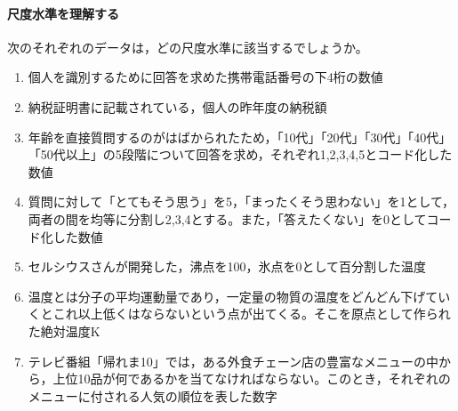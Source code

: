 \documentclass{ltjsbook}
\begin{document}
\paragraph{尺度水準を理解する}次のそれぞれのデータは，どの尺度水準に該当するでしょうか。
\begin{enumerate}
	\item 個人を識別するために回答を求めた携帯電話番号の下4桁の数値
	\item 納税証明書に記載されている，個人の昨年度の納税額
	\item 年齢を直接質問するのがはばかられたため，「10代」「20代」「30代」「40代」「50代以上」の5段階について回答を求め，それぞれ1,2,3,4,5とコード化した数値
	\item 質問に対して「とてもそう思う」を5，「まったくそう思わない」を1として，両者の間を均等に分割し2,3,4とする。また，「答えたくない」を0としてコード化した数値
	\item セルシウスさんが開発した，沸点を100，氷点を0として百分割した温度
	\item 温度とは分子の平均運動量であり，一定量の物質の温度をどんどん下げていくとこれ以上低くはならないという点が出てくる。そこを原点として作られた絶対温度K
	\item テレビ番組「帰れま10」では，ある外食チェーン店の豊富なメニューの中から，上位10品が何であるかを当てなければならない。このとき，それぞれのメニューに付される人気の順位を表した数字
\end{enumerate}
\end{document}
